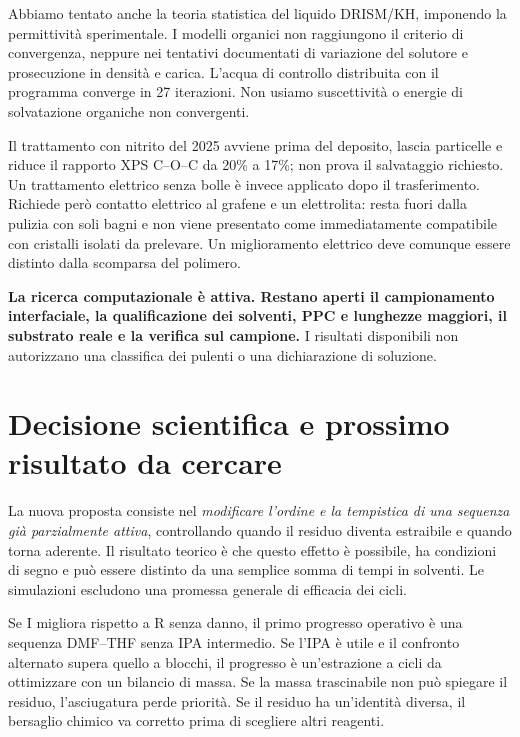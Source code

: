 \documentclass[11pt,reqno]{amsart}
\numberwithin{equation}{section}
\begin{document}
Abbiamo tentato anche la teoria statistica del liquido DRISM/KH,
imponendo la permittivit\`a sperimentale. I modelli organici
non raggiungono il criterio di convergenza, neppure nei tentativi
documentati di variazione del solutore e prosecuzione in densit\`a
e carica. L'acqua di controllo distribuita con il programma
converge in 27 iterazioni. Non usiamo suscettivit\`a o energie
di solvatazione organiche non convergenti.

Il trattamento con nitrito del 2025 \cite{LeeNitrite2025} avviene
prima del deposito, lascia particelle e riduce il rapporto XPS
C--O--C da 20\% a 17\%; non prova il salvataggio richiesto.
Un trattamento elettrico senza bolle \cite{Park2018} \`e invece
applicato dopo il trasferimento. Richiede per\`o contatto elettrico
al grafene e un elettrolita: resta fuori dalla pulizia con soli bagni
e non viene presentato come immediatamente compatibile con
cristalli isolati da prelevare. Un miglioramento elettrico deve
comunque essere distinto dalla scomparsa del polimero.

\textbf{La ricerca computazionale \`e attiva. Restano aperti il
campionamento interfaciale, la qualificazione dei solventi,
PPC e lunghezze maggiori, il substrato reale e la verifica sul campione.}
I risultati disponibili non autorizzano una classifica dei pulenti
o una dichiarazione di soluzione.

\section{Decisione scientifica e prossimo risultato da cercare}

La nuova proposta consiste nel \emph{modificare l'ordine e la
tempistica di una sequenza gi\`a parzialmente attiva}, controllando
quando il residuo diventa estraibile e quando torna aderente.
Il risultato teorico \`e che questo effetto \`e possibile, ha
condizioni di segno e pu\`o essere distinto da una semplice
somma di tempi in solventi. Le simulazioni escludono una
promessa generale di efficacia dei cicli.

Se I migliora rispetto a R senza danno, il primo progresso
operativo \`e una sequenza DMF--THF senza IPA intermedio.
Se l'IPA \`e utile e il confronto alternato supera quello
a blocchi, il progresso \`e un'estrazione a cicli da ottimizzare
con un bilancio di massa. Se la massa trascinabile non pu\`o
spiegare il residuo, l'asciugatura perde priorit\`a. Se il
residuo ha un'identit\`a diversa, il bersaglio chimico va
corretto prima di scegliere altri reagenti.
\end{document}
